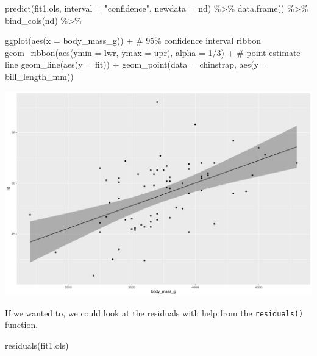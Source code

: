 \documentclass[
  letterpaper,
  DIV=11,
  numbers=noendperiod]{scrartcl}
\newenvironment{Shaded}{\begin{snugshade}}{\end{snugshade}}
\newcommand{\AttributeTok}[1]{\textcolor[rgb]{0.40,0.45,0.13}{#1}}
\newcommand{\CommentTok}[1]{\textcolor[rgb]{0.37,0.37,0.37}{#1}}
\newcommand{\DecValTok}[1]{\textcolor[rgb]{0.68,0.00,0.00}{#1}}
\newcommand{\FunctionTok}[1]{\textcolor[rgb]{0.28,0.35,0.67}{#1}}
\newcommand{\NormalTok}[1]{\textcolor[rgb]{0.00,0.23,0.31}{#1}}
\newcommand{\SpecialCharTok}[1]{\textcolor[rgb]{0.37,0.37,0.37}{#1}}
\newcommand{\StringTok}[1]{\textcolor[rgb]{0.13,0.47,0.30}{#1}}
\begin{document}
\begin{Shaded}
\begin{Highlighting}[]
\FunctionTok{predict}\NormalTok{(fit1.ols,}
        \AttributeTok{interval =} \StringTok{"confidence"}\NormalTok{,}
        \AttributeTok{newdata =}\NormalTok{ nd) }\SpecialCharTok{\%\textgreater{}\%} 
  \FunctionTok{data.frame}\NormalTok{() }\SpecialCharTok{\%\textgreater{}\%} 
  \FunctionTok{bind\_cols}\NormalTok{(nd) }\SpecialCharTok{\%\textgreater{}\%} 
  
  \FunctionTok{ggplot}\NormalTok{(}\FunctionTok{aes}\NormalTok{(}\AttributeTok{x =}\NormalTok{ body\_mass\_g)) }\SpecialCharTok{+}
  \CommentTok{\# 95\% confidence interval ribbon}
  \FunctionTok{geom\_ribbon}\NormalTok{(}\FunctionTok{aes}\NormalTok{(}\AttributeTok{ymin =}\NormalTok{ lwr, }\AttributeTok{ymax =}\NormalTok{ upr),}
              \AttributeTok{alpha =} \DecValTok{1}\SpecialCharTok{/}\DecValTok{3}\NormalTok{) }\SpecialCharTok{+}
  \CommentTok{\# point estimate line}
  \FunctionTok{geom\_line}\NormalTok{(}\FunctionTok{aes}\NormalTok{(}\AttributeTok{y =}\NormalTok{ fit)) }\SpecialCharTok{+}
  \FunctionTok{geom\_point}\NormalTok{(}\AttributeTok{data =}\NormalTok{ chinstrap,}
             \FunctionTok{aes}\NormalTok{(}\AttributeTok{y =}\NormalTok{ bill\_length\_mm))}
\end{Highlighting}
\end{Shaded}

\includegraphics{Bayes_Lab_1_files/figure-pdf/unnamed-chunk-16-1.pdf}

If we wanted to, we could look at the residuals with help from the
\texttt{residuals()} function.

\begin{Shaded}
\begin{Highlighting}[]
\FunctionTok{residuals}\NormalTok{(fit1.ols)}
\end{Highlighting}
\end{Shaded}
\end{document}
